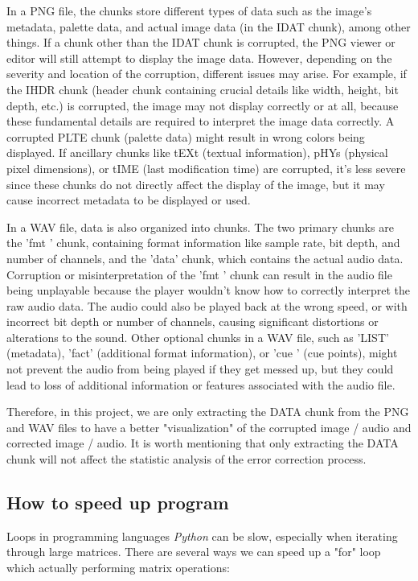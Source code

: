 \documentclass{article}
\begin{document}
In a PNG file, the chunks store different types of data such as the image's metadata, palette data, and actual image data (in the IDAT chunk), among other things. 
If a chunk other than the IDAT chunk is corrupted, the PNG viewer or editor will still attempt to display the image data. However, depending on the severity and location of the corruption, different issues may arise. 
For example, if the IHDR chunk (header chunk containing crucial details like width, height, bit depth, etc.) is corrupted, the image may not display correctly or at all, because these fundamental details are required to interpret the image data correctly. 
A corrupted PLTE chunk (palette data) might result in wrong colors being displayed. 
If ancillary chunks like tEXt (textual information), pHYs (physical pixel dimensions), or tIME (last modification time) are corrupted, it's less severe since these chunks do not directly affect the display of the image, but it may cause incorrect metadata to be displayed or used.

In a WAV file, data is also organized into chunks. The two primary chunks are the 'fmt ' chunk, containing format information like sample rate, bit depth, and number of channels, and the 'data' chunk, which contains the actual audio data.
Corruption or misinterpretation of the 'fmt ' chunk can result in the audio file being unplayable because the player wouldn't know how to correctly interpret the raw audio data. The audio could also be played back at the wrong speed, or with incorrect bit depth or number of channels, causing significant distortions or alterations to the sound.
Other optional chunks in a WAV file, such as 'LIST' (metadata), 'fact' (additional format information), or 'cue ' (cue points), might not prevent the audio from being played if they get messed up, but they could lead to loss of additional information or features associated with the audio file.

Therefore, in this project, we are only extracting the DATA chunk from the PNG and WAV files to have a better "visualization" of the corrupted image / audio and corrected image / audio. It is worth mentioning that only extracting the DATA chunk will not affect the statistic analysis of the error correction process. 

\subsection{How to speed up program}
Loops in programming languages \textit{Python} can be slow, especially when iterating through large matrices. There are several ways we can speed up a "for" loop which actually performing matrix operations:
\end{document}
